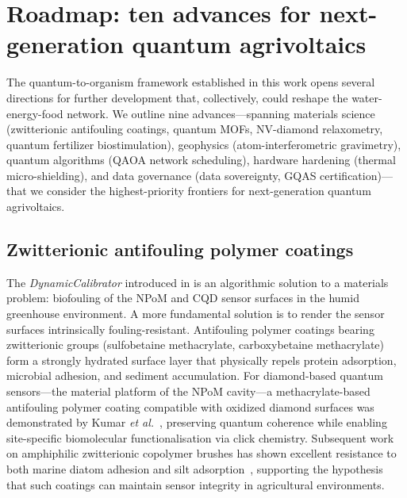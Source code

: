 \documentclass[11pt,a4paper]{article}
\begin{document}

\section{Roadmap: ten advances for next-generation quantum agrivoltaics}
\label{SI-sec:roadmap}

The quantum-to-organism framework established in this work opens several
directions for further development that, collectively, could reshape the
water-energy-food network. We outline nine advances---spanning materials
science (zwitterionic antifouling coatings, quantum MOFs, NV-diamond relaxometry,
quantum fertilizer biostimulation), geophysics (atom-interferometric gravimetry),
quantum algorithms (QAOA network scheduling), hardware hardening (thermal
micro-shielding), and data governance (data sovereignty, GQAS certification)---that
we consider the highest-priority frontiers for next-generation quantum agrivoltaics.

\subsection{Zwitterionic antifouling polymer coatings}
\label{SI-sec:zwitterionic}

The \textit{DynamicCalibrator} introduced in  is an
algorithmic solution to a materials problem: biofouling of the NPoM and CQD
sensor surfaces in the humid greenhouse environment. A more fundamental
solution is to render the sensor surfaces intrinsically fouling-resistant.
Antifouling polymer coatings bearing zwitterionic groups (sulfobetaine
methacrylate, carboxybetaine methacrylate) form a strongly hydrated surface
layer that physically repels protein adsorption, microbial adhesion, and
sediment accumulation. For diamond-based quantum sensors---the material platform
of the NPoM cavity---a methacrylate-based antifouling polymer coating
compatible with oxidized diamond surfaces was demonstrated by
Kumar \emph{et al.}~\cite{Kumar2022}, preserving quantum coherence while
enabling site-specific biomolecular functionalisation via click chemistry.
Subsequent work on amphiphilic zwitterionic copolymer brushes has shown
excellent resistance to both marine diatom adhesion and silt
adsorption~\cite{Do2025}, supporting the hypothesis that such coatings can
maintain sensor integrity in agricultural environments.
\end{document}
